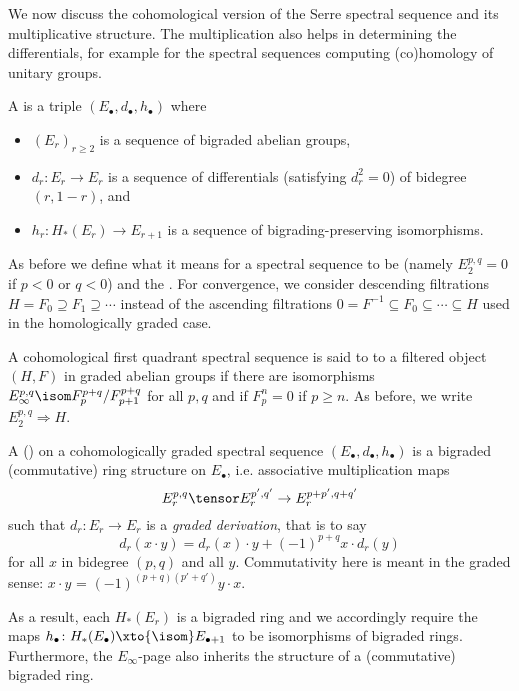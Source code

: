\documentclass[wip, topology]{bsteffan-lecturenotes}
\begin{document}
We now discuss the cohomological version of the Serre spectral sequence and its multiplicative structure.
The multiplication also helps in determining the differentials, for example for the spectral sequences computing (co)homology of unitary groups.
\begin{definition}
	A 	is a triple $(E_\bullet, d_\bullet, h_\bullet)$ where
	\begin{itemize}
		\item $(E_r)_{r \geq 2}$ is a sequence of bigraded abelian groups,
		\item $d_r\colon E_r \to E_r$ is a sequence of differentials (satisfying $d_r^2 = 0$) of bidegree $(r, 1 - r)$, and
		\item $h_r\colon H_*(E_r) \to E_{r + 1}$ is a sequence of bigrading-preserving isomorphisms.
	\end{itemize}
\end{definition}
As before we define what it means for a spectral sequence to be  (namely $E^{p, q}_2 = 0$ if $p < 0$ or $q < 0$) and the .
For convergence, we consider descending filtrations $H = F_0 \supseteq F_1 \supseteq \cdots$ instead of the ascending filtrations $0 = F^{-1} \subseteq F_0 \subseteq \cdots \subseteq H$ used in the homologically graded case.
\begin{definition}
	A cohomological first quadrant spectral sequence is said to  to a filtered object $(H, F)$ in graded abelian groups if there are isomorphisms $E^{p, q}_\infty \isom F^{p + q}_p / F^{p + q}_{p + 1}$ for all $p, q$ and if $F^n_p = 0$ if $p \geq n$.
	As before, we write $E^{p, q}_2 \Rightarrow H$.
\end{definition}
\begin{definition}
	A ()  on a cohomologically graded spectral sequence $(E_\bullet, d_\bullet, h_\bullet)$ is a bigraded (commutative) ring structure on $E_\bullet$, i.e. associative multiplication maps
	\begin{equation*}
		E_r^{p, q} \tensor E_r^{p', q'} \to E_r^{p + p', q + q'}
	\end{equation*}
	such that $d_r\colon E_r \to E_r$ is a \emph{graded derivation}, that is to say
	\begin{equation*}
		d_r(x \cdot y) = d_r(x) \cdot y + (-1)^{p + q} x \cdot d_r(y)
	\end{equation*}
	for all $x$ in bidegree $(p, q)$ and all $y$.
	Commutativity here is meant in the graded sense: $x \cdot y$ = $(-1)^{(p + q)(p' + q')} y \cdot x$.

	As a result, each $H_*(E_r)$ is a bigraded ring and we accordingly require the maps $h_\bullet\colon H_*(E_\bullet) \xto{\isom} E_{\bullet + 1}$ to be isomorphisms of bigraded rings.
	Furthermore, the $E_\infty$-page also inherits the structure of a (commutative) bigraded ring.
\end{definition}
\end{document}

